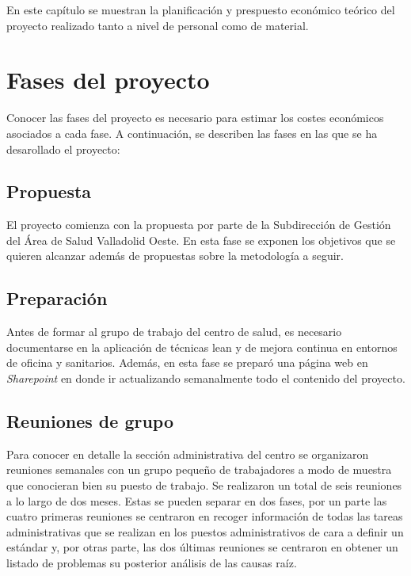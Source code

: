 En este capítulo se muestran la planificación y prespuesto económico teórico del proyecto realizado tanto a nivel de personal como de material.

\section{Fases del proyecto}

Conocer las fases del proyecto es necesario para estimar los costes económicos asociados a cada fase.
A continuación, se describen las fases en las que se ha desarollado el proyecto:

\subsection{Propuesta}

El proyecto comienza con la propuesta por parte de la Subdirección de Gestión del Área de Salud Valladolid Oeste. En esta fase se exponen los objetivos que se quieren alcanzar además de propuestas sobre la metodología a seguir.

\subsection{Preparación}

Antes de formar al grupo de trabajo del centro de salud, es necesario documentarse en la aplicación de técnicas lean y de mejora continua en entornos de oficina y sanitarios. Además, en esta fase se preparó una página web en \textit{Sharepoint} en donde ir actualizando semanalmente todo el contenido del proyecto.

\subsection{Reuniones de grupo}

Para conocer en detalle la sección administrativa del centro se organizaron reuniones semanales con un grupo pequeño de trabajadores a modo de muestra que conocieran bien su puesto de trabajo.
Se realizaron un total de seis reuniones a lo largo de dos meses.
Estas se pueden separar en dos fases, por un parte las cuatro primeras reuniones se centraron en recoger información de todas las tareas administrativas que se realizan en los puestos administrativos de cara a definir un estándar y, por otras parte, las dos últimas reuniones se centraron en obtener un listado de problemas su posterior análisis de las causas raíz.

